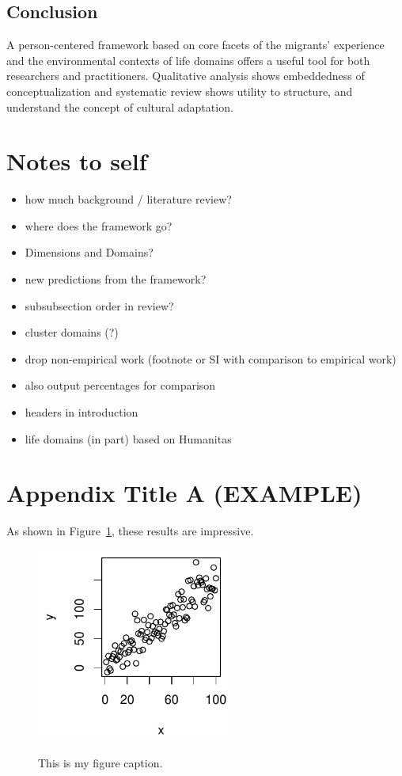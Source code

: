 \documentclass[man, 12pt, a4paper]{apa7}
\begin{document}
\subsection{Conclusion}
A person-centered framework based on core facets of the migrants’ experience and the environmental contexts of life domains offers a useful tool for both researchers and practitioners. Qualitative analysis shows embeddedness of conceptualization and systematic review shows utility to structure, and understand the concept of cultural adaptation.

\section{Notes to self}
\begin{itemize}
  \item how much background / literature review?
  \item where does the framework go?
  \item Dimensions and Domains?
  \item new predictions from the framework?
  \item subsubsection order in review?
  \item cluster domains (?)
  \item drop non-empirical work (footnote or SI with comparison to empirical work)
  \item also output percentages for comparison
  \item headers in introduction
  \item life domains (in part) based on Humanitas
\end{itemize}

\printbibliography

\appendix

\section{Appendix Title A (EXAMPLE)}
\label{app:AppendixLableA}

As shown in Figure~\ref{fig:FigureAppendix}, these results are impressive. 

\begin{figure}
    \caption{This is my figure caption.}
    \includegraphics[bb=0in 0in 2.5in 2.5in, height=2.5in, width=2.5in]{Figures/Figure1.pdf}
    \label{fig:FigureAppendix}
\end{figure}
\end{document}

